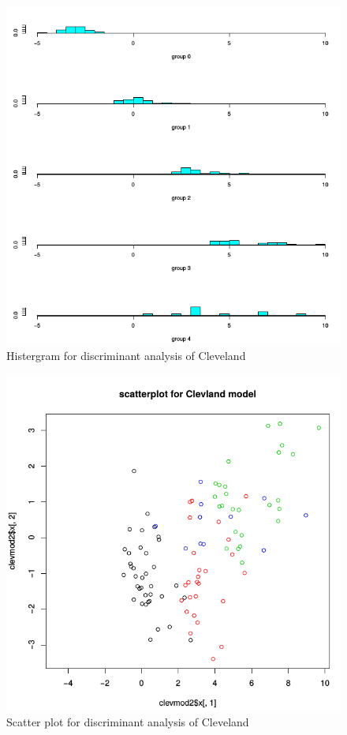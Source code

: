 \documentclass[a4paper]{article}
\begin{document}


\begin{figure}[H]
	\begin{center}
		\includegraphics[width=12cm]{Q4_pics/Clev-Histgram.png}
	\end{center}
	\caption{Histergram for discriminant analysis of Cleveland}
	\label{q4_clev_historgram}
\end{figure}

\begin{figure}[H]
	\begin{center}
		\includegraphics[width=12cm]{Q4_pics/Clev-scatter.png}
	\end{center}
	\caption{Scatter plot for discriminant analysis of Cleveland}
	\label{q4_clev_scatter}
\end{figure}
\end{document}
